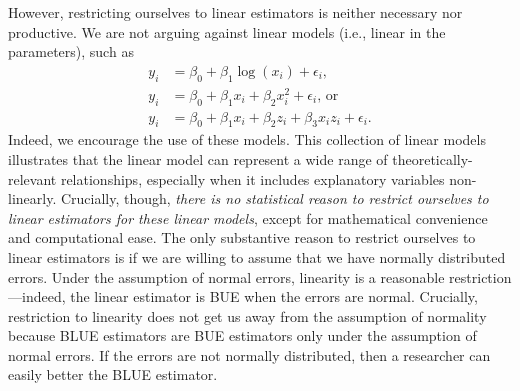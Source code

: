 \documentclass[12pt]{article}
\begin{document}
However, restricting ourselves to linear estimators is neither necessary nor productive. 
We are not arguing against linear models (i.e., linear in the parameters), such as 
\begin{align}
y_i &= \beta_0 + \beta_1\log(x_i) + \epsilon_i\text{,}\\
y_i &= \beta_0 + \beta_1x_i + \beta_2x_i^2 + \epsilon_i\text{, or}\\ 
y_i &= \beta_0 + \beta_1x_i + \beta_2z_i + \beta_3x_iz_i + \epsilon_i\textit{.}
\end{align}
Indeed, we encourage the use of these models. This collection of linear models illustrates that the linear model can represent a wide range of theoretically-relevant relationships, especially when it includes explanatory variables non-linearly. 
Crucially, though, \textit{there is no statistical reason to restrict ourselves to linear \textit{estimators} for these linear models}, except for mathematical convenience and computational ease.
The only substantive reason to restrict ourselves to linear estimators is if we are willing to assume that we have normally distributed errors. 
Under the assumption of normal errors, linearity is a reasonable restriction---indeed, the linear estimator is BUE when the errors are normal.
Crucially, restriction to linearity does not get us away from the assumption of normality because BLUE estimators are BUE estimators only under the assumption of normal errors.
If the errors are not normally distributed, then a researcher can easily better the BLUE estimator.
\end{document}
